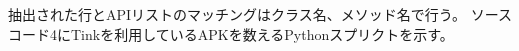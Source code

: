 抽出された行とAPIリストのマッチングはクラス名、メソッド名で行う。
ソースコード4にTinkを利用しているAPKを数えるPythonスプリクトを示す。%



































